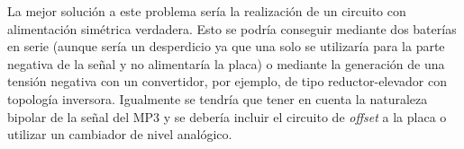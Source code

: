 La mejor solución a este problema sería la realización de un circuito con alimentación simétrica verdadera. Esto se podría conseguir mediante dos baterías en serie (aunque sería un desperdicio ya que una solo se utilizaría para la parte negativa de la señal y no alimentaría la placa) o mediante la generación de una tensión negativa con un convertidor, por ejemplo, de tipo reductor-elevador con topología inversora. Igualmente se tendría que tener en cuenta la naturaleza bipolar de la señal del MP3 y se debería incluir el circuito de \textit{offset} a la placa o utilizar un cambiador de nivel analógico.